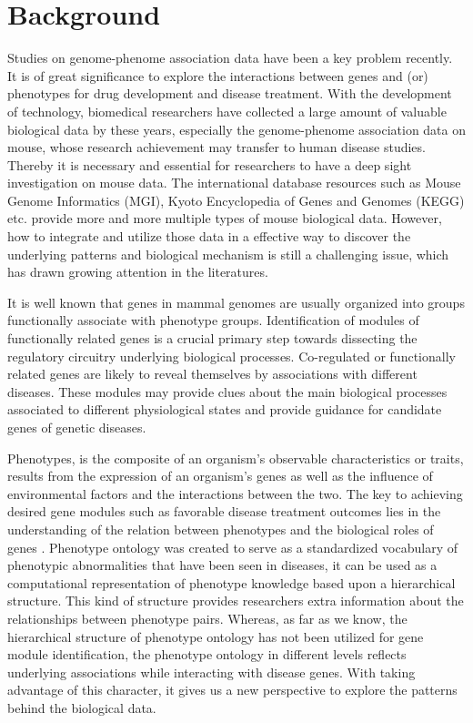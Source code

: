 \documentclass{bmcart}
\begin{document}
\section*{Background}
Studies on genome-phenome association data have been a key problem recently. It is of great significance to explore the interactions between genes and (or) phenotypes for drug development and disease treatment. With the development of technology, biomedical researchers have collected a large amount of valuable biological data by these years, especially the genome-phenome association data on mouse, whose research achievement may transfer to human disease studies. Thereby it is necessary and essential for researchers to have a deep sight investigation on mouse data. The international database resources such as Mouse Genome Informatics (MGI)\cite{Eppig2015}, Kyoto Encyclopedia of Genes and Genomes (KEGG)\cite{Kanehisa2000} etc. provide more and more multiple types of mouse biological data. However, how to integrate and utilize those data in a effective way to discover the underlying patterns and biological mechanism is still a challenging issue, which has drawn growing attention in the literatures.

It is well known that genes in mammal genomes are usually organized into groups functionally associate with phenotype groups\cite{XuanH2015,Yao2011,Lage2007,Oti2006}. Identification of modules of functionally related genes is a crucial primary step towards dissecting the regulatory circuitry underlying biological processes. Co-regulated or functionally related genes are likely to reveal themselves by associations with different diseases. These modules may provide clues about the main biological processes associated to different physiological states and provide guidance for candidate genes of genetic diseases.

Phenotypes, is the composite of an organism's observable characteristics or traits, results from the expression of an organism's genes as well as the influence of environmental factors and the interactions between the two\cite{McKusick2007,PhilipGroth2006}. The key to achieving desired gene modules such as favorable disease treatment outcomes lies in the understanding of the relation between phenotypes and the biological roles of genes \cite{Sawyers2008,Rubin2008,Edwards2004}. Phenotype ontology was created to serve as a standardized vocabulary of phenotypic abnormalities that have been seen in diseases, it can be used as a computational representation of phenotype knowledge based upon a hierarchical structure\cite{Robinson2014,Kohler2014,Smith2009}. This kind of structure provides researchers extra information about the relationships between phenotype pairs. Whereas, as far as we know, the hierarchical structure of phenotype ontology has not been utilized for gene module identification, the phenotype ontology in different levels reflects underlying associations while interacting with disease genes. With taking advantage of this character, it gives us a new perspective to explore the patterns behind the biological data.
\end{document}
